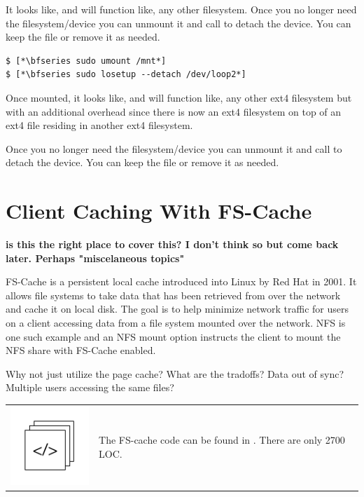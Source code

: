 \noindent
It looks like, and will function like, any other filesystem. Once you no longer need the filesystem/device you can unmount it and call  to detach the device. You can keep the file or remove it as needed.

\begin{lstlisting}
$ [*\bfseries sudo umount /mnt*]
$ [*\bfseries sudo losetup --detach /dev/loop2*]
\end{lstlisting}

\noindent
Once mounted, it looks like, and will function like, any other ext4 filesystem but with an additional overhead since there is now an ext4 filesystem on top of an ext4 file residing in another ext4 filesystem. 

Once you no longer need the filesystem/device you can unmount it and call  to detach the device. You can keep the file or remove it as needed.


\section{Client Caching With FS-Cache}

\textbf{is this the right place to cover this? I don't think so but come back later. Perhaps "miscelaneous topics"}


FS-Cache is a persistent local cache introduced into Linux by Red Hat in 2001. It allows file systems to take data that has been retrieved from over the network and cache it on local disk. The goal is to help minimize network traffic for users on a client accessing data from a file system mounted over the network. NFS is one such example and an NFS mount option instructs the client to mount the NFS share with FS-Cache enabled.

Why not just utilize the page cache? What are the tradoffs? Data out of sync? Multiple users accessing the same files?


\begin{table}[h]
\begin{tabular}{ll}
\parbox[l]{0.6in}{\includegraphics[scale=0.8]{figures/src-xref.pdf}} & \parbox[l]{4in}{\small{The FS-cache code can be found in . There are only 2700 LOC.}}
\end{tabular}
\end{table}

